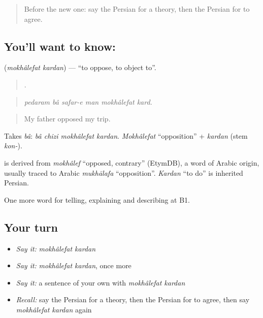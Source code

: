 \label{lesson:FA-C361-mokhalefat-kardan}



\begin{quote}
Before the new one: say the Persian for a theory, then the Persian for to agree.
\end{quote}

\subsection*{You'll want to know:  }
\textbf{ } (\emph{mokhâlefat kardan}) — \textquotedblleft{}to oppose, to object to\textquotedblright{}.

\begin{quote}
     .
\end{quote}

\begin{quote}
\emph{pedaram bâ safar-e man mokhâlefat kard.}
\end{quote}

\begin{quote}
My father opposed my trip.
\end{quote}

Takes \emph{bâ}: \emph{bâ chizi mokhâlefat kardan}. \emph{Mokhâlefat} \textquotedblleft{}opposition\textquotedblright{} + \emph{kardan} (stem \emph{kon-}).

\begin{cousinweb}
\textbf{} is derived from \emph{mokhâlef} \textquotedblleft{}opposed, contrary\textquotedblright{} (EtymDB), a word of Arabic origin, usually traced to Arabic \emph{mukhālafa} \textquotedblleft{}opposition\textquotedblright{}. \emph{Kardan} \textquotedblleft{}to do\textquotedblright{} is inherited Persian.
\end{cousinweb}

\begin{grammarlens}[title={What you've built}]
One more word for telling, explaining and describing at B1.
\end{grammarlens}

\subsection*{Your turn}
\begin{itemize}
\raggedright
  \item \emph{Say it:} \emph{mokhâlefat kardan}
  \item \emph{Say it:} \emph{mokhâlefat kardan}, once more
  \item \emph{Say it:} a sentence of your own with \emph{mokhâlefat kardan}
  \item \emph{Recall:} say the Persian for a theory, then the Persian for to agree, then say \emph{mokhâlefat kardan} again
\end{itemize}

